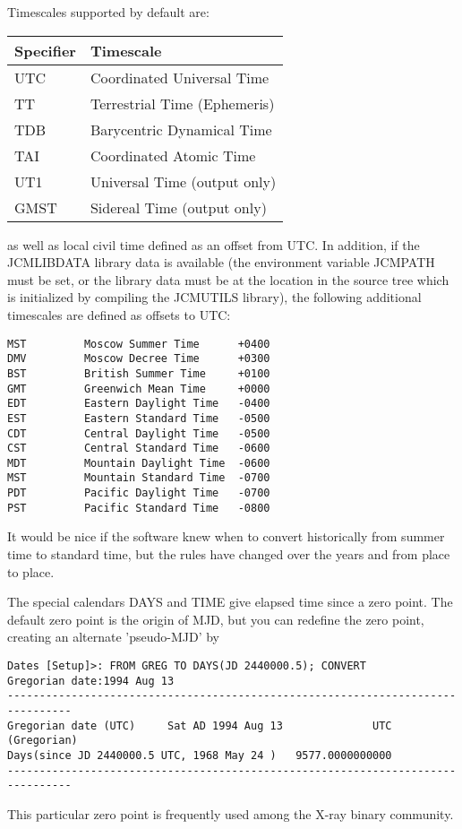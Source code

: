 \documentclass{article}
\begin{document}
Timescales supported by default are:
\begin{longtable}{lp{3.0in}}
Specifier & Timescale   \\
\hline
UTC       & Coordinated Universal Time \\
TT        & Terrestrial Time (Ephemeris)\\
TDB       & Barycentric Dynamical Time \\
TAI       & Coordinated Atomic Time    \\
UT1       & Universal Time (output only) \\
GMST      & Sidereal Time (output only) \\
\hline
\end{longtable}
as well as local civil time defined as an offset from
UTC. In addition, if the JCMLIBDATA library data is
available (the environment variable JCMPATH must be
set, or the library data must be at the location
in the source tree which is 
initialized by compiling the JCMUTILS library), the following
additional timescales are defined as offsets to UTC:

\begin{verbatim}
MST         Moscow Summer Time      +0400
DMV         Moscow Decree Time      +0300
BST         British Summer Time     +0100
GMT         Greenwich Mean Time     +0000
EDT         Eastern Daylight Time   -0400
EST         Eastern Standard Time   -0500
CDT         Central Daylight Time   -0500
CST         Central Standard Time   -0600
MDT         Mountain Daylight Time  -0600
MST         Mountain Standard Time  -0700
PDT         Pacific Daylight Time   -0700
PST         Pacific Standard Time   -0800
\end{verbatim}

It would be nice if the software knew when to convert historically
from summer time to standard time, but the rules have changed over
the years and from place to place.

The special calendars DAYS and TIME
give elapsed time since a zero point. The default
zero point is the origin of MJD, but you can redefine the
zero point, creating an
alternate 'pseudo-MJD' by
\begin{verbatim}
Dates [Setup]>: FROM GREG TO DAYS(JD 2440000.5); CONVERT
Gregorian date:1994 Aug 13
--------------------------------------------------------------------------------
Gregorian date (UTC)     Sat AD 1994 Aug 13              UTC (Gregorian)
Days(since JD 2440000.5 UTC, 1968 May 24 )   9577.0000000000
--------------------------------------------------------------------------------
\end{verbatim}
This particular zero point is frequently used among the X-ray binary
community.
\end{document}

